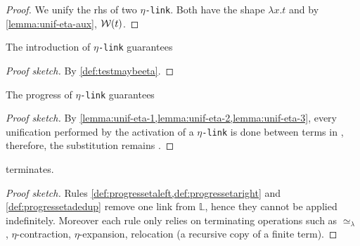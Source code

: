 \documentclass[sigconf,natbib=false,review]{acmart}
\newcommand{\UnifRel}{\ensuremath{\simeq}}
\newcommand{\Ue}{\ensuremath{\UnifRel_\lambda}\xspace}
\newcommand{\linkMacro}[1]{\ensuremath{#1}\texttt{-link}\xspace}
\newcommand{\linketa} {\linkMacro{\eta}}
\newcommand{\rhs}{rhs\xspace}
\newcommand{\linkStore}{\texorpdfstring{\ensuremath{\mathbb{L}}\xspace}{L}}
\begin{document}
\begin{proof}
  We unify the \rhs{} of two \linketa. Both have the
  shape $\lambda x.t$ and by \cref{lemma:unif-eta-aux}, $\mathcal{W}(t)$.
\end{proof}

\begin{lemma}
  The introduction of \linketa guarantees 
\end{lemma}

\begin{proof}[Proof sketch]
  By \cref{def:testmaybeeta}.
\end{proof}

\begin{lemma}
  The progress of \linketa guarantees 
  \label{lemma:unif-wellb}
\end{lemma}

\begin{proof}[Proof sketch]
  By \cref{lemma:unif-eta-1,lemma:unif-eta-2,lemma:unif-eta-3}, every
  unification performed by the activation of a \linketa is done between
  terms in \wellb, therefore, the substitution remains \wellb.
\end{proof}

\begin{lemma}
   terminates.
  \label{lemma:prog-eta-terminates}
\end{lemma}

\begin{proof}[Proof sketch]
  Rules \cref{def:progressetaleft,def:progressetaright} and
  \cref{def:progressetadedup} remove one link from \linkStore, hence they
  cannot be applied indefinitely.
  Moreover each rule only relies on terminating operations such as \Ue,
  $\eta$-contraction, $\eta$-expansion, relocation (a recursive copy of a
  finite term).
\end{proof}
\end{document}
